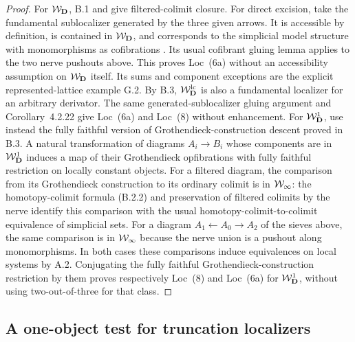 \begin{proof}
For $\mathcal W_{\mathbf D}$, B.1 and
\citet[Corollary~4.2.22]{Cisinski2006} give filtered-colimit
closure. For direct excision, take the fundamental sublocalizer
generated by the three given arrows. It is accessible by
definition, is contained in $\mathcal W_{\mathbf D}$, and corresponds to the
simplicial model structure with monomorphisms as cofibrations
\citep[Theorems~1.4.3 and~4.2.15]{Cisinski2006}. Its usual
cofibrant gluing lemma applies to the two nerve pushouts above.
This proves Loc~(6a) without an accessibility assumption on
$\mathcal W_{\mathbf D}$ itself. Its sums and component
exceptions are the explicit represented-lattice example G.2.
By B.3, $\mathcal W_{\mathbf D}^{\mathrm{lc}}$ is also a fundamental localizer for an arbitrary
derivator. The same generated-sublocalizer gluing argument and
Corollary~4.2.22 give Loc~(6a) and Loc~(8) without enhancement.
For $\mathcal W_{\mathbf D}^{1}$, use instead the fully faithful version of
Grothendieck-construction descent proved in B.3. A natural
transformation of diagrams $A_i\to B_i$ whose components are
in $\mathcal W_{\mathbf D}^{1}$ induces a map of their Grothendieck opfibrations
with fully faithful restriction on locally constant objects.
For a filtered diagram, the comparison from its Grothendieck
construction to its ordinary colimit is in $\mathcal W_{\infty}$: the
homotopy-colimit formula (B.2.2) and preservation of filtered
colimits by the nerve identify this comparison with the
usual homotopy-colimit-to-colimit equivalence of simplicial
sets. For a diagram $A_1\leftarrow A_0\to A_2$ of the
sieves above, the same comparison is in $\mathcal W_{\infty}$ because
the nerve union is a pushout along monomorphisms. In both
cases these comparisons induce equivalences on local systems
by A.2. Conjugating the fully faithful Grothendieck-construction
restriction by them proves respectively Loc~(8) and Loc~(6a)
for $\mathcal W_{\mathbf D}^{1}$, without using two-out-of-three for that class.
\end{proof}



\subsection{A one-object test for truncation localizers}

